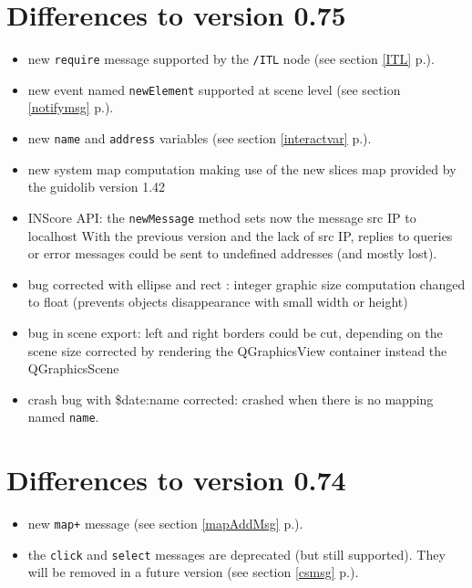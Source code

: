 \documentclass[a4paper,twoside]{report}
\newcommand{\sublevel}[1]	{\section{#1}}
\newcommand{\fullref}[1]	{\ref{#1} p.\pageref{#1}}
\newcommand{\OSC}[1]		{\texttt{#1}}
\begin{document}
\sublevel{Differences to version 0.75}
\begin{itemize}
\item new \OSC{require} message supported by the \OSC{/ITL} node (see section \fullref{ITL}).
\item new event named \OSC{newElement} supported at scene level (see section \fullref{notifymsg}).
\item new \OSC{name} and \OSC{address} variables (see section \fullref{interactvar}).
\item new system map computation making use of the new slices map provided by the guidolib version 1.42
\item INScore API: the \OSC{newMessage} method sets now the message src IP to localhost
  With the previous version and the lack of src IP, replies to queries or error 
  messages could be sent to undefined addresses (and mostly lost).
\item bug corrected with ellipse and rect : integer graphic size computation changed 
  to float (prevents objects disappearance with small width or height)
\item bug in scene export: left and right borders could be cut, depending  on the scene size
  corrected by rendering the QGraphicsView container instead the QGraphicsScene
\item crash bug with \$date:name corrected: crashed when there is no mapping named \OSC{name}.
\end{itemize}

\sublevel{Differences to version 0.74}
\begin{itemize}
\item new \OSC{map+} message  (see section \fullref{mapAddMsg}).
\item the \OSC{click} and \OSC{select} messages are deprecated (but still supported). They will be removed in a future version (see section \fullref{csmsg}).
\end{itemize}
\end{document}
